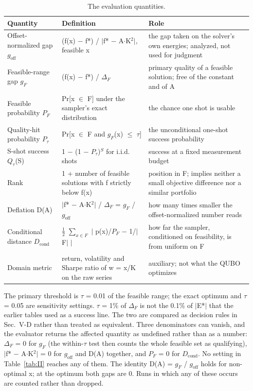 \documentclass[journal]{IEEEtran}
\begin{document}
\begin{table}[!t]
\centering
\scriptsize
\caption{The evaluation quantities.}
\label{tab:I}
\begin{tabular}{p{}p{}p{}}
\toprule
Quantity & Definition & Role \\
\midrule
Offset-normalized gap $g_{\mathrm{off}}$ & (f(x) $-$ f*) / $|$f* $-$ A$\cdot$K$^{2}$$|$, feasible x & the gap taken on the solver's own energies; analyzed, not used for judgment \\
Feasible-range gap $g_{F}$ & (f(x) $-$ f*) / $\Delta_{F}$ & primary quality of a feasible solution; free of the constant and of A \\
Feasible probability $P_{F}$ & Pr[x $\in$ F] under the sampler's exact distribution & the chance one shot is usable \\
Quality-hit probability $P_{\tau}$ & Pr[x $\in$ F and $g_{F}$(x) $\leq$ $\tau$] & the unconditional one-shot success probability \\
S-shot success $Q_{\tau}$(S) & 1 $-$ (1 $-$ $P_{\tau}$)$^{S}$ for i.i.d. shots & success at a fixed measurement budget \\
Rank & 1 + number of feasible solutions with f strictly below f(x) & position in F; implies neither a small objective difference nor a similar portfolio \\
Deflation D(A) & $|$f* $-$ A$\cdot$K$^{2}$$|$ / $\Delta_{F}$ = $g_{F}$ / $g_{\mathrm{off}}$ & how many times smaller the offset-normalized number reads \\
Conditional distance $D_{\mathrm{cond}}$ & $\tfrac{1}{2}$ $\sum_{x\in F}$ $|$ p(x)/$P_{F}$ $-$ 1/$|$F$|$ $|$ & how far the sampler, conditioned on feasibility, is from uniform on F \\
Domain metric & return, volatility and Sharpe ratio of w = x/K on the raw series & auxiliary; not what the QUBO optimizes \\
\bottomrule
\end{tabular}
\end{table}


The primary threshold is $\tau$ = 0.01 of the feasible range; the exact optimum and $\tau$ = 0.05 are sensitivity settings. $\tau$ = 1\% of $\Delta_{F}$ is not the 0.1\% of $|$E*$|$ that the earlier tables used as a success line. The two are compared as decision rules in Sec.~V-D rather than treated as equivalent. Three denominators can vanish, and the evaluator returns the affected quantity as undefined rather than as a number: $\Delta_{F}$ = 0 for $g_{F}$ (the within-$\tau$ test then counts the whole feasible set as qualifying), $|$f* $-$ A$\cdot$K$^{2}$$|$ = 0 for $g_{\mathrm{off}}$ and D(A) together, and $P_{F}$ = 0 for $D_{\mathrm{cond}}$. No setting in Table~\ref{tab:II} reaches any of them. The identity D(A) = $g_{F}$ / $g_{\mathrm{off}}$ holds for non-optimal x; at the optimum both gaps are 0. Runs in which any of these occurs are counted rather than dropped.
\end{document}
